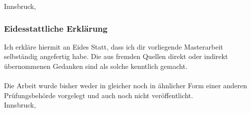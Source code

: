 \documentclass[a4paper,11pt,listof=nochaptergap,oneside,pointednumbers,bibtotoc,bigheadings,liststotoc,hidelinks]{scrbook}
\theoremstyle{mysatz}
\theoremstyle{mydefinition}
\theoremstyle{mytheorem}
\theoremstyle{mybemerkung}
\renewcommand*{\paragraph}[1]{\subsubsection*{#1} \vspace{-3mm}} %
\begin{document}
    Innsbruck, \makebox[1.8in][l]{\hrulefill} \qquad \makebox[2.6in]{\hrulefill}\\
    \makebox[2.95in][l]      \hfill{}

\clearpage
\thispagestyle{empty}
\null\vspace{46pt}
\paragraph{\large{Eidesstattliche Erklärung}}
\vspace{43pt}
Ich erkläre hiermit an Eides Statt, dass ich dir vorliegende Masterarbeit selbständig angefertig habe. Die aus fremden Quellen direkt oder indirekt übernommenen Gedanken sind als solche kenntlich gemacht. \\
\\
Die Arbeit wurde bisher weder in gleicher noch in ähnlicher Form einer anderen Prüfungsbehörde vorgelegt und auch noch nicht veröffentlicht.\\[10mm]

    Innsbruck, \makebox[1.8in][l]{\hrulefill} \qquad \makebox[2.6in]{\hrulefill}\\
    \makebox[2.95in][l]      \hfill{}


\end{document}
